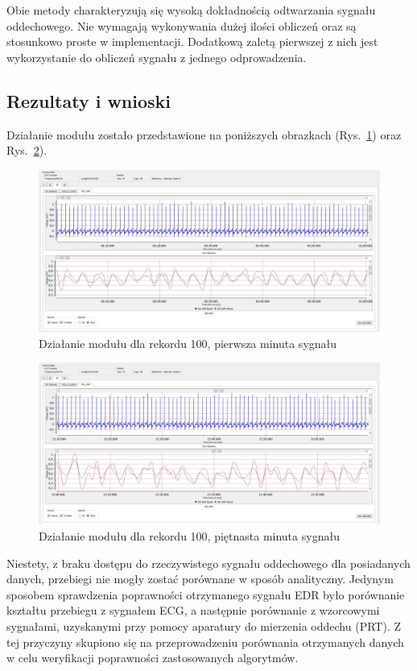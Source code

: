 	Obie metody charakteryzują się wysoką dokładnością odtwarzania sygnału oddechowego. Nie wymagają wykonywania dużej ilości obliczeń oraz są stosunkowo proste w implementacji. Dodatkową zaletą pierwszej z nich jest wykorzystanie do obliczeń sygnału z jednego odprowadzenia.
	
\subsection{Rezultaty i wnioski}

	Działanie modułu zostało przedstawione na poniższych obrazkach (Rys.~\ref{fig:aplikacja_1}) oraz Rys.~\ref{fig:aplikacja_2}).
	
\begin{figure}[h]
\centering
\includegraphics[width=12cm]{SIG_EDR/img/aplikacja_1_1.jpg}
\caption{Działanie modułu dla rekordu 100, pierwsza minuta sygnału}
\label{fig:aplikacja_1}
\end{figure}

\begin{figure}[h]
\centering
\includegraphics[width=12cm]{SIG_EDR/img/aplikacja_2_2.jpg}
\caption{Działanie modułu dla rekordu 100, piętnasta minuta sygnału}
\label{fig:aplikacja_2}
\end{figure}

	Niestety, z braku dostępu do rzeczywistego sygnału oddechowego dla posiadanych danych, przebiegi nie mogły zostać porównane w sposób analityczny. Jedynym sposobem sprawdzenia poprawności otrzymanego sygnału EDR było porównanie kształtu przebiegu z sygnałem ECG, a następnie porównanie z wzorcowymi sygnałami, uzyskanymi przy pomocy aparatury do mierzenia oddechu (PRT). Z tej przyczyny skupiono się na przeprowadzeniu porównania otrzymanych danych w celu weryfikacji poprawności zastosowanych algorytmów. 
	
